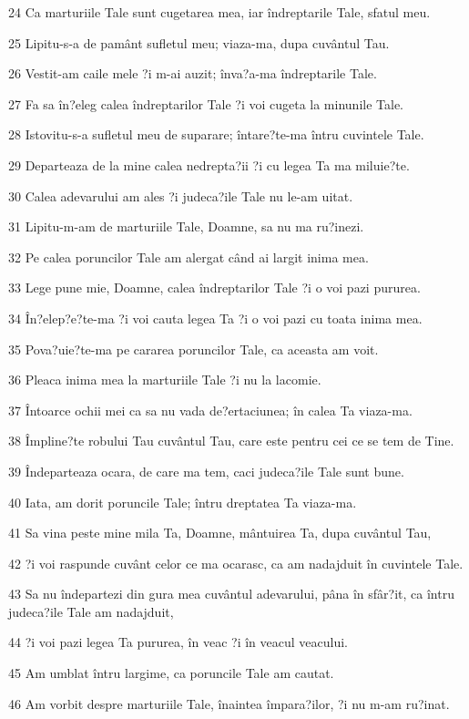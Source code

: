 \par 24 Ca marturiile Tale sunt cugetarea mea, iar îndreptarile Tale, sfatul meu.
\par 25 Lipitu-s-a de pamânt sufletul meu; viaza-ma, dupa cuvântul Tau.
\par 26 Vestit-am caile mele ?i m-ai auzit; înva?a-ma îndreptarile Tale.
\par 27 Fa sa în?eleg calea îndreptarilor Tale ?i voi cugeta la minunile Tale.
\par 28 Istovitu-s-a sufletul meu de suparare; întare?te-ma întru cuvintele Tale.
\par 29 Departeaza de la mine calea nedrepta?ii ?i cu legea Ta ma miluie?te.
\par 30 Calea adevarului am ales ?i judeca?ile Tale nu le-am uitat.
\par 31 Lipitu-m-am de marturiile Tale, Doamne, sa nu ma ru?inezi.
\par 32 Pe calea poruncilor Tale am alergat când ai largit inima mea.
\par 33 Lege pune mie, Doamne, calea îndreptarilor Tale ?i o voi pazi pururea.
\par 34 În?elep?e?te-ma ?i voi cauta legea Ta ?i o voi pazi cu toata inima mea.
\par 35 Pova?uie?te-ma pe cararea poruncilor Tale, ca aceasta am voit.
\par 36 Pleaca inima mea la marturiile Tale ?i nu la lacomie.
\par 37 Întoarce ochii mei ca sa nu vada de?ertaciunea; în calea Ta viaza-ma.
\par 38 Împline?te robului Tau cuvântul Tau, care este pentru cei ce se tem de Tine.
\par 39 Îndeparteaza ocara, de care ma tem, caci judeca?ile Tale sunt bune.
\par 40 Iata, am dorit poruncile Tale; întru dreptatea Ta viaza-ma.
\par 41 Sa vina peste mine mila Ta, Doamne, mântuirea Ta, dupa cuvântul Tau,
\par 42 ?i voi raspunde cuvânt celor ce ma ocarasc, ca am nadajduit în cuvintele Tale.
\par 43 Sa nu îndepartezi din gura mea cuvântul adevarului, pâna în sfâr?it, ca întru judeca?ile Tale am nadajduit,
\par 44 ?i voi pazi legea Ta pururea, în veac ?i în veacul veacului.
\par 45 Am umblat întru largime, ca poruncile Tale am cautat.
\par 46 Am vorbit despre marturiile Tale, înaintea împara?ilor, ?i nu m-am ru?inat.
